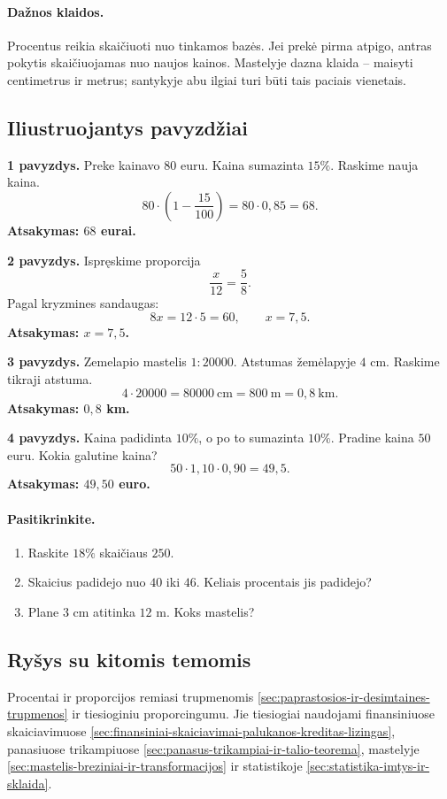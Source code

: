 \paragraph{Dažnos klaidos.}
Procentus reikia skaičiuoti nuo tinkamos bazės. Jei prekė pirma atpigo, antras pokytis skaičiuojamas nuo naujos kainos. Mastelyje dazna klaida -- maisyti centimetrus ir metrus; santykyje abu ilgiai turi būti tais paciais vienetais.

\subsection{Iliustruojantys pavyzdžiai}
\textbf{1 pavyzdys.} Preke kainavo $80$ euru. Kaina sumazinta $15\%$. Raskime nauja kaina.
\[
80\cdot\left(1-\frac{15}{100}\right)=80\cdot0{,}85=68.
\]
\textbf{Atsakymas: $68$ eurai.}

\textbf{2 pavyzdys.} Ispręskime proporcija
\[
\frac{x}{12}=\frac58.
\]
Pagal kryzmines sandaugas:
\[
8x=12\cdot5=60,\qquad x=7{,}5.
\]
\textbf{Atsakymas: $x=7{,}5$.}

\textbf{3 pavyzdys.} Zemelapio mastelis $1:20000$. Atstumas žemėlapyje $4$ cm. Raskime tikraji atstuma.
\[
4\cdot20000=80000\ \text{cm}=800\ \text{m}=0{,}8\ \text{km}.
\]
\textbf{Atsakymas: $0{,}8$ km.}

\textbf{4 pavyzdys.} Kaina padidinta $10\%$, o po to sumazinta $10\%$. Pradine kaina $50$ euru. Kokia galutine kaina?
\[
50\cdot1{,}10\cdot0{,}90=49{,}5.
\]
\textbf{Atsakymas: $49{,}50$ euro.}

\paragraph{Pasitikrinkite.}
\begin{enumerate}[label=\alph*)]
\item Raskite $18\%$ skaičiaus $250$.
\item Skaicius padidejo nuo $40$ iki $46$. Keliais procentais jis padidejo?
\item Plane $3$ cm atitinka $12$ m. Koks mastelis?
\end{enumerate}

\subsection{Ryšys su kitomis temomis}
Procentai ir proporcijos remiasi trupmenomis \ref{sec:paprastosios-ir-desimtaines-trupmenos} ir tiesioginiu proporcingumu. Jie tiesiogiai naudojami finansiniuose skaiciavimuose \ref{sec:finansiniai-skaiciavimai-palukanos-kreditas-lizingas}, panasiuose trikampiuose \ref{sec:panasus-trikampiai-ir-talio-teorema}, mastelyje \ref{sec:mastelis-breziniai-ir-transformacijos} ir statistikoje \ref{sec:statistika-imtys-ir-sklaida}.

